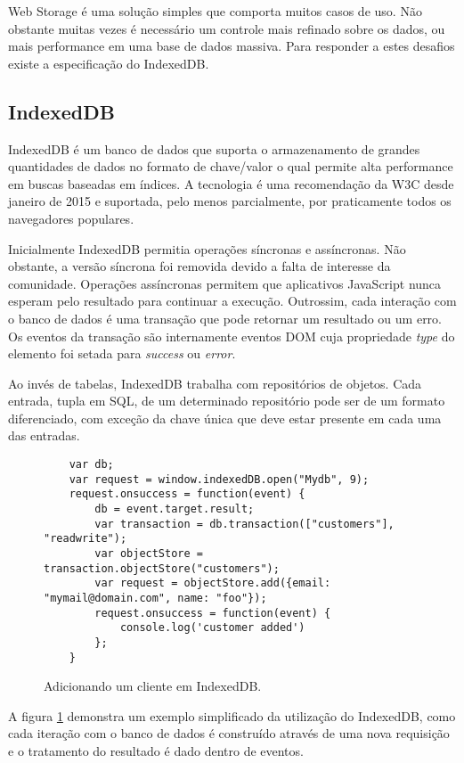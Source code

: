 Web Storage é uma solução simples que comporta muitos casos de uso.
Não obstante muitas vezes é necessário um controle mais refinado
sobre os dados, ou mais performance em uma base de dados massiva. Para
responder a estes desafios existe a especificação do IndexedDB.

\subsection{IndexedDB}
IndexedDB é um banco de dados que suporta o armazenamento de grandes
quantidades de dados no formato de chave/valor o qual  permite alta
performance em buscas baseadas em índices. A tecnologia é uma recomendação
da W3C desde janeiro de 2015 e suportada, pelo menos parcialmente, por
praticamente todos os navegadores populares.

Inicialmente IndexedDB permitia operações síncronas e assíncronas.
Não obstante, a versão síncrona foi removida devido a falta de
interesse da comunidade. Operações assíncronas permitem que
aplicativos JavaScript nunca esperam pelo resultado para continuar a
execução. Outrossim, cada interação com o banco de dados é uma
transação que pode retornar um resultado ou um erro. Os eventos da
transação são internamente eventos DOM cuja propriedade \textit{type}
do elemento foi setada para \textit{success} ou \textit{error}.

Ao invés de tabelas, IndexedDB trabalha com repositórios de objetos.
Cada entrada, tupla em SQL, de um determinado repositório pode ser de
um formato diferenciado, com exceção da chave única que deve estar
presente em cada uma das entradas.

\begin{figure}
\centering
\begin{verbatim}
	var db;
	var request = window.indexedDB.open("Mydb", 9);
	request.onsuccess = function(event) {
		db = event.target.result;
		var transaction = db.transaction(["customers"], "readwrite");
		var objectStore = transaction.objectStore("customers");
		var request = objectStore.add({email: "mymail@domain.com", name: "foo"});
		request.onsuccess = function(event) {
			console.log('customer added')
		};
	}
\end{verbatim}
\caption{Adicionando um cliente em IndexedDB.}
\label{fig:IndexedDB}
\end{figure}

A figura \ref{fig:IndexedDB} demonstra um exemplo simplificado da
utilização do IndexedDB, como cada iteração com o banco de dados é
construído através de uma nova requisição e o tratamento do resultado
é dado dentro de eventos.

